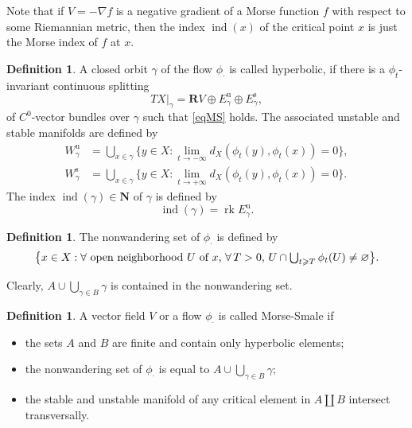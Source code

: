 \documentclass[JEP,XML,SOM,Unicode]{cedram}
\newcommand{\rs}{\mathrm{s}}
\newcommand{\ru}{\mathrm{u}}
\theoremstyle{plain}
\theoremstyle{definition}
\newtheorem{defin}[lem]{Definition}
\theoremstyle{remark}
\newcommand{\bN}{\mathbf{N}}
\newcommand{\bR}{\mathbf{R}}
\DeclareMathOperator{\ind}{ind}
\DeclareMathOperator{\rk}{rk}
\let\g\geqslant
\begin{document}
Note that if $V=-\nabla f$ is a negative gradient of a Morse function
$f$
with respect to some Riemannian metric, then the index $\ind(x)$ of
the critical point $x$ is just the Morse index of $f$ at $x$.

\begin{defin}
A closed orbit $\gamma$ of the flow $\phi_{\cdot}$ is called hyperbolic,
if there is a $\phi_{t}$-invariant continuous splitting\vspace*{-3pt}
\begin{equation*}\label{eq:AF1}
TX|_{\gamma}=\bR V\oplus E^{\ru}_{\gamma}\oplus E^{\rs}_{\gamma},
\end{equation*}
of $C^{0}$-vector
bundles over $\gamma$ such that \eqref{eqMS} holds. The associated unstable and
stable manifolds are defined by
\begin{equation*}
\begin{aligned}
W^{\ru}_{\gamma}&=\bigcup_{x\in \gamma} \bigl\{y\in X: \textstyle\lim_{t\to
-\infty}d_{X}(\phi_{t}(y),\phi_{t}(x))=0 \bigr\},\\
W^{\rs}_{\gamma}&=\bigcup_{x\in \gamma} \bigl\{y\in X: \textstyle\lim_{t\to
+\infty}d_{X}(\phi_{t}(y),\phi_{t}(x))=0 \bigr\}.
\end{aligned}
\end{equation*}
The index $\ind(\gamma)\in \bN$ of $\gamma$ is defined by
\begin{equation}\label{indexg}
\ind(\gamma)=\rk E^{\ru}_{\gamma}.
\end{equation}
\end{defin}

\begin{defin}
The nonwandering set of $\phi_{\cdot}$ is defined by\vspace*{-3pt}
\begin{equation*}\textstyle
\bigl\{x\in X: \hbox{$\forall$ open neighborhood $U$ of $x$,
$\forall\, T>0$, } U\cap\bigcup_{t\g T} \phi_{t}(U)\neq
\varnothing \bigr\}.
\end{equation*}
\end{defin}
Clearly, $A\cup \bigcup_{\gamma\in B}\gamma$ is contained in the nonwandering set.

\begin{defin}
A vector field $V$ or a flow $\phi_{\cdot}$ is called Morse-Smale if
\begin{itemize}
\item the sets $A$ and $B$ are finite and contain only hyperbolic elements;
\item the nonwandering set of
$\phi_{\cdot}$ is equal to
$ A\cup \bigcup_{\gamma\in B}\gamma$;
\item the stable and unstable manifold of any critical
element in $A\coprod B$ intersect transversally.
\end{itemize}
\end{defin}
\end{document}

